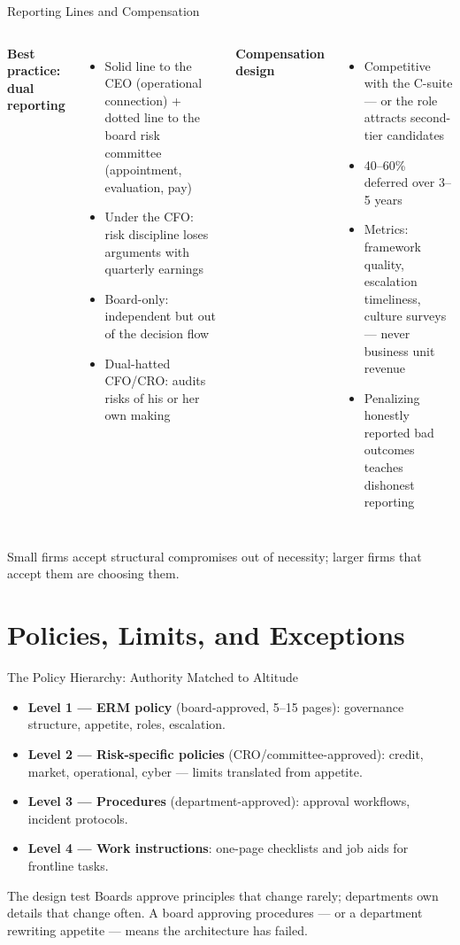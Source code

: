 \documentclass[11pt, aspectratio=169]{beamer}
\begin{document}
\begin{frame}{Reporting Lines and Compensation}
\begin{columns}[T]
\textbf{Best practice: dual reporting}
\begin{itemize}
  \item Solid line to the \alert{CEO} (operational connection) + dotted line to the \alert{board risk committee} (appointment, evaluation, pay)
  \item Under the CFO: risk discipline loses arguments with quarterly earnings
  \item Board-only: independent but out of the decision flow
  \item Dual-hatted CFO/CRO: audits risks of his or her own making
\end{itemize}
\textbf{Compensation design}
\begin{itemize}
  \item Competitive with the C-suite --- or the role attracts second-tier candidates
  \item 40--60\% deferred over 3--5 years
  \item Metrics: framework quality, escalation timeliness, culture surveys --- \alert{never} business unit revenue
  \item Penalizing honestly reported bad outcomes teaches dishonest reporting
\end{itemize}
\end{columns}
\medskip
Small firms accept structural compromises out of necessity; larger firms that accept them are choosing them.
\end{frame}

\section{Policies, Limits, and Exceptions}

\begin{frame}{The Policy Hierarchy: Authority Matched to Altitude}
\begin{itemize}
  \item \textbf{Level 1 --- ERM policy} (board-approved, 5--15 pages): governance structure, appetite, roles, escalation.
  \item \textbf{Level 2 --- Risk-specific policies} (CRO/committee-approved): credit, market, operational, cyber --- limits translated from appetite.
  \item \textbf{Level 3 --- Procedures} (department-approved): approval workflows, incident protocols.
  \item \textbf{Level 4 --- Work instructions}: one-page checklists and job aids for frontline tasks.
\end{itemize}
\medskip
\begin{block}{The design test}
Boards approve principles that change rarely; departments own details that change often. A board approving procedures --- or a department rewriting appetite --- means the architecture has failed.
\end{block}
\end{frame}
\end{document}
